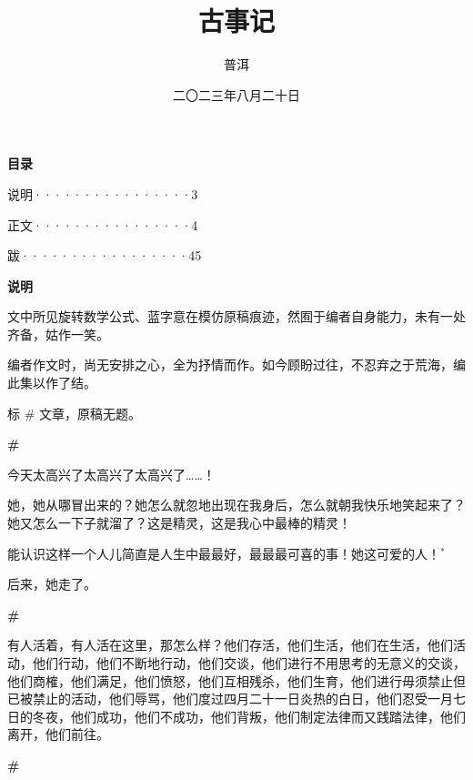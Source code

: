 \documentclass{ctexbook}
\title{\LARGE 古事记}
\author{普洱}
\date{二〇二三年八月二十日}
\begin{document}
\maketitle

\Large

\newpage
\textbf{目录}


\mbox


    说明················3


\mbox

    
    正文················4


\mbox

    
    跋·················45







\newpage
\textbf{\LARGE 说明}


\mbox


    文中所见旋转数学公式、蓝字意在模仿原稿痕迹，然囿于编者自身能力，未有一处齐备，姑作一笑。

    编者作文时，尚无安排之心，全为抒情而作。如今顾盼过往，不忍弃之于荒海，编此集以作了结。
    
    标 \# 文章，原稿无题。



\newpage

\textbf{\#}


\mbox


	今天太高兴了太高兴了太高兴了……！
	
	她，她从哪冒出来的？她怎么就忽地出现在我身后，怎么就朝我快乐地笑起来了？她又怎么一下子就溜了？这是精灵，这是我心中最棒的精灵！
	
	能认识这样一个人儿简直是人生中最最好，最最最可喜的事！她这可爱的人！\(^*\)


\mbox


    {\normalsize * 后来，她走了。}

\newpage

\textbf{\#}


\mbox


    有人活着，有人活在这里，那怎么样？他们存活，他们生活，他们在生活，他们活动，他们行动，他们不断地行动，他们交谈，他们进行不用思考的无意义的交谈，他们商榷，他们满足，他们愤怒，他们互相残杀，他们生育，他们进行毋须禁止但已被禁止的活动，他们辱骂，他们度过四月二十一日炎热的白日，他们忍受一月七日的冬夜，他们成功，他们不成功，他们背叛，他们制定法律而又践踏法律，他们离开，他们前往。

\newpage

\textbf{\#}
\end{document}
